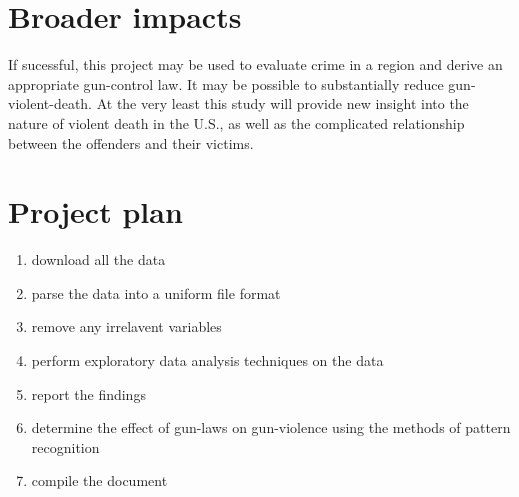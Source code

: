 \section{Broader impacts}

If sucessful, this project may be used to evaluate crime in a region and derive an appropriate gun-control law.  It may be possible to substantially reduce gun-violent-death.  At the very least this study will provide new insight into the nature of violent death in the U.S., as well as the complicated relationship between the offenders and their victims.

\section{Project plan}

\begin{enumerate}

  \item download all the data

  \item parse the data into a uniform file format

  \item remove any irrelavent variables

  \item perform exploratory data analysis techniques on the data

  \item report the findings

  \item determine the effect of gun-laws on gun-violence using the methods of pattern recognition

  \item compile the document

\end{enumerate}

\printbibliography






